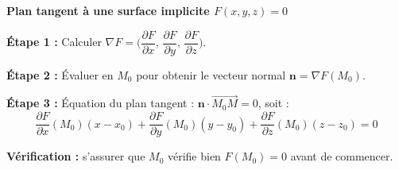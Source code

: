 \documentclass[11pt,a4paper]{article}
\begin{document}
\vspace{6pt}

\begin{methodebox}
\textbf{Plan tangent à une surface implicite $F(x,y,z)=0$}

\textbf{Étape 1 :} Calculer $\nabla F = \bigl(\dfrac{\partial F}{\partial x},\,\dfrac{\partial F}{\partial y},\,\dfrac{\partial F}{\partial z}\bigr)$.

\textbf{Étape 2 :} Évaluer en $M_0$ pour obtenir le vecteur normal $\mathbf{n} = \nabla F(M_0)$.

\textbf{Étape 3 :} Équation du plan tangent : $\mathbf{n}\cdot\overrightarrow{M_0M} = 0$, soit :
$$\frac{\partial F}{\partial x}(M_0)(x-x_0) + \frac{\partial F}{\partial y}(M_0)(y-y_0) + \frac{\partial F}{\partial z}(M_0)(z-z_0) = 0$$

\textbf{Vérification :} s'assurer que $M_0$ vérifie bien $F(M_0) = 0$ avant de commencer.
\end{methodebox}
\end{document}
